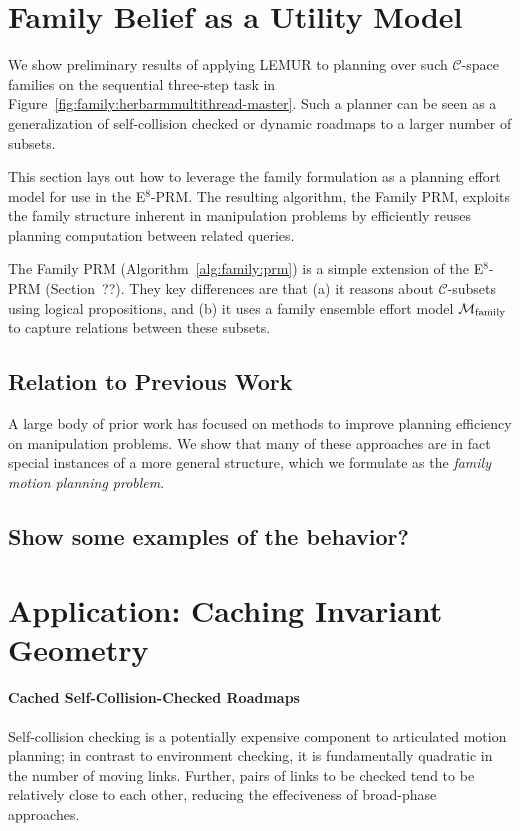 \section{Family Belief as a Utility Model}
\label{sec:family:as-utility}

We show preliminary results of applying LEMUR to planning over
such $\mathcal{C}$-space families on the sequential
three-step task in
Figure~\ref{fig:family:herbarmmultithread-master}.
Such a planner can be seen as a generalization of self-collision checked
\citep{leven2002changing} or dynamic \citep{jaillet2004dynamicprm}
roadmaps to a larger number of subsets.

This section lays out how to leverage the family formulation
as a planning effort model
for use in the E$^8$-PRM.
The resulting algorithm,
the Family PRM,
exploits the family structure inherent in manipulation problems
by efficiently reuses planning computation between related queries.

The Family PRM (Algorithm~\ref{alg:family:prm}) is a simple
extension of the \mbox{E$^8$-PRM}
(Section~??).
They key differences are that
(a) it reasons about $\mathcal{C}$-subsets
using logical propositions,
and (b) it uses a family ensemble effort model
$\mathcal{M}_{\mbox{\scriptsize family}}$ to capture relations
between these subsets.

\subsection{Relation to Previous Work}

A large body of prior work has focused on methods to
improve planning efficiency on manipulation problems.
We show that many of these approaches are
in fact special instances of a more general structure,
which we formulate as the \emph{family motion planning problem}.

\subsection{Show some examples of the behavior?}

\section{Application: Caching Invariant Geometry}
\label{subsec:family:cached-self-valid}

\paragraph{Cached Self-Collision-Checked Roadmaps}
Self-collision checking is a potentially expensive component to
articulated motion planning;
in contrast to environment checking,
it is fundamentally quadratic in the number of moving links.
Further, pairs of links to be checked
tend to be relatively close to each other,
reducing the effeciveness of broad-phase approaches.


